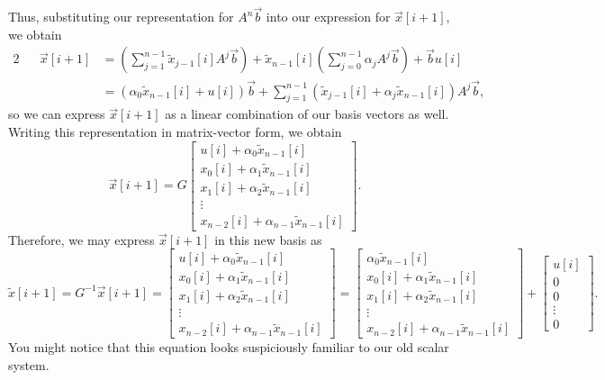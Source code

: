 \documentclass[letterpaper]{article}
\theoremstyle{remark}
\renewcommand{\tilde}[1]{\widetilde{#1}}
\newcommand{\mat}[1]{\ensuremath{\begin{bmatrix}#1\end{bmatrix}}}
\newcommand{\eqn}[1]{\begin{alignat*}{2}#1\end{alignat*}}
\begin{document}
Thus, substituting our representation for $A^n\vec{b}$ into our expression for $\vec{x}[i + 1]$, we obtain
\eqn{
    && \vec{x}[i + 1] &= \left(\sum_{j = 1}^{n - 1} \tilde{x}_{j-1}[i] A^{j} \vec{b}\right) + \tilde{x}_{n-1}[i]\left(\sum_{j=0}^{n-1} \alpha_jA^j\vec{b}\right) + \vec{b}u[i] \\
    &&&= (\alpha_0 \tilde{x}_{n-1}[i] + u[i])\vec{b} + \sum_{j = 1}^{n - 1} (\tilde{x}_{j-1}[i] + \alpha_j \tilde{x}_{n-1}[i]) A^{j} \vec{b},
}
so we can express $\vec{x}[i+1]$ as a linear combination of our basis vectors as well. Writing this representation in matrix-vector form, we obtain
\[
    \vec{x}[i + 1] = G\mat{u[i] + \alpha_0 \tilde{x}_{n-1}[i] \\ x_0[i] + \alpha_1 \tilde{x}_{n-1}[i] \\ x_1[i] + \alpha_2 \tilde{x}_{n-1}[i] \\ \vdots \\ x_{n-2}[i] + \alpha_{n-1} \tilde{x}_{n-1}[i]}.
\]
Therefore, we may express $\vec{x}[i+1]$ in this new basis as
\[
    \tilde{x}[i + 1] = G^{-1}\vec{x}[i + 1] = \mat{u[i] + \alpha_0 \tilde{x}_{n-1}[i] \\ x_0[i] + \alpha_1 \tilde{x}_{n-1}[i] \\ x_1[i] + \alpha_2 \tilde{x}_{n-1}[i] \\ \vdots \\ x_{n-2}[i] + \alpha_{n-1} \tilde{x}_{n-1}[i]} = \mat{\alpha_0 \tilde{x}_{n-1}[i] \\ x_0[i] + \alpha_1 \tilde{x}_{n-1}[i] \\ x_1[i] + \alpha_2 \tilde{x}_{n-1}[i] \\ \vdots \\ x_{n-2}[i] + \alpha_{n-1} \tilde{x}_{n-1}[i]} + \mat{u[i] \\ 0 \\ 0 \\ \vdots \\ 0}.
\]
You might notice that this equation looks suspiciously familiar to our old scalar system.
\end{document}
